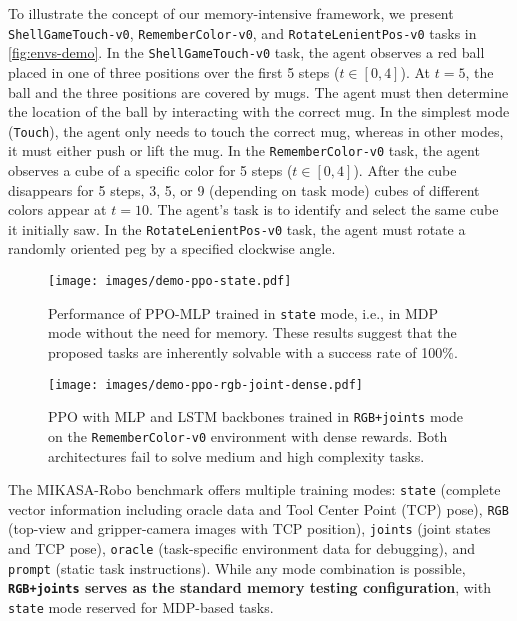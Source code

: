 To illustrate the concept of our memory-intensive framework, we present \texttt{ShellGameTouch-v0},  \texttt{RememberColor-v0}, and \texttt{RotateLenientPos-v0} tasks in \autoref{fig:envs-demo}. In the \texttt{ShellGameTouch-v0} task, the agent observes a red ball placed in one of three positions over the first 5 steps ($t \in [0, 4]$). At $t = 5$, the ball and the three positions are covered by mugs. The agent must then determine the location of the ball by interacting with the correct mug. In the simplest mode (\texttt{Touch}), the agent only needs to touch the correct mug, whereas in other modes, it must either push or lift the mug. In the \texttt{RememberColor-v0} task, the agent observes a cube of a specific color for 5 steps ($t \in [0, 4]$). After the cube disappears for 5 steps, 3, 5, or 9 (depending on task mode) cubes of different colors appear at $t = 10$. The agent’s task is to identify and select the same cube it initially saw. In the \texttt{RotateLenientPos-v0} task, the agent must rotate a randomly oriented peg by a specified clockwise angle.

\begin{figure*}[t!]
\centering
\begin{minipage}[t]{0.48\textwidth}
    \centering
    \texttt{[image: images/demo-ppo-state.pdf]}
    \caption{Performance of PPO-MLP trained in \texttt{state} mode, i.e., in MDP mode without the need for memory. These results suggest that the proposed tasks are inherently solvable with a success rate of 100$\%$.}
    \label{fig:demo-state}
\end{minipage}%
\hfill
\begin{minipage}[t]{0.48\textwidth}
    \centering
    \texttt{[image: images/demo-ppo-rgb-joint-dense.pdf]}
    \caption{PPO with MLP and LSTM backbones trained in \texttt{RGB+joints} mode on the \texttt{RememberColor-v0} environment with dense rewards. Both architectures fail to solve medium and high complexity tasks.}
    \label{fig:demo-rgb-joint-dense}
\end{minipage}
\vspace{-10pt}
\end{figure*}

The MIKASA-Robo benchmark offers multiple training modes: \texttt{state} (complete vector information including oracle data and Tool Center Point (TCP) pose), \texttt{RGB} (top-view and gripper-camera images with TCP position), \texttt{joints} (joint states and TCP pose), \texttt{oracle} (task-specific environment data for debugging), and \texttt{prompt} (static task instructions). While any mode combination is possible, \textbf{\texttt{RGB+joints} serves as the standard memory testing configuration}, with \texttt{state} mode reserved for MDP-based tasks.


